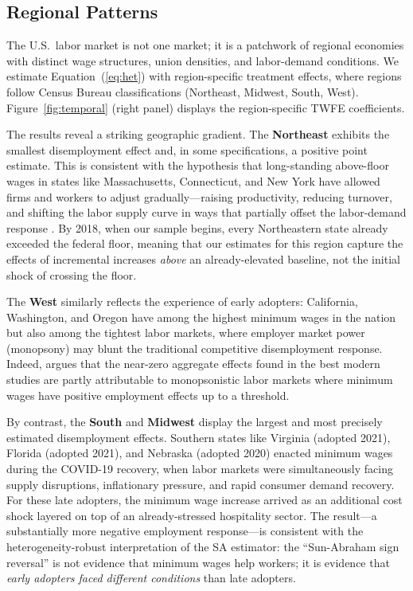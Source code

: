 \documentclass[12pt]{article}
\begin{document}
\subsection{Regional Patterns}

The U.S.\ labor market is not one market; it is a patchwork of regional
economies with distinct wage structures, union densities, and labor-demand
conditions.  We estimate Equation~(\ref{eq:het}) with region-specific
treatment effects, where regions follow Census Bureau classifications
(Northeast, Midwest, South, West).  Figure~\ref{fig:temporal} (right panel)
displays the region-specific TWFE coefficients.

The results reveal a striking geographic gradient.  The \textbf{Northeast}
exhibits the smallest disemployment effect and, in some specifications, a
positive point estimate.  This is consistent with the hypothesis that
long-standing above-floor wages in states like Massachusetts, Connecticut,
and New York have allowed firms and workers to adjust gradually---raising
productivity, reducing turnover, and shifting the labor supply curve in ways
that partially offset the labor-demand response \citep{dube2019fairwage}.
By 2018, when our sample begins, every Northeastern state already exceeded
the federal floor, meaning that our estimates for this region capture the
effects of incremental increases \emph{above} an already-elevated baseline,
not the initial shock of crossing the floor.

The \textbf{West} similarly reflects the experience of early adopters:
California, Washington, and Oregon have among the highest minimum wages in
the nation but also among the tightest labor markets, where employer market
power (monopsony) may blunt the traditional competitive disemployment
response.  Indeed, \citet{manning2021elusive} argues that the near-zero
aggregate effects found in the best modern studies are partly attributable
to monopsonistic labor markets where minimum wages have positive employment
effects up to a threshold.

By contrast, the \textbf{South} and \textbf{Midwest} display the largest
and most precisely estimated disemployment effects.  Southern states like
Virginia (adopted 2021), Florida (adopted 2021), and Nebraska (adopted 2020)
enacted minimum wages during the COVID-19 recovery, when labor markets were
simultaneously facing supply disruptions, inflationary pressure, and rapid
consumer demand recovery.  For these late adopters, the minimum wage increase
arrived as an additional cost shock layered on top of an already-stressed
hospitality sector.  The result---a substantially more negative employment
response---is consistent with the heterogeneity-robust interpretation of the
SA estimator: the ``Sun-Abraham sign reversal'' is not evidence that minimum
wages help workers; it is evidence that \emph{early adopters faced different
conditions} than late adopters.
\end{document}
